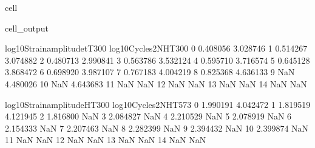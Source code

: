 \documentclass[letterpaper,10pt,english]{jupyterBook}
\begin{document}
\begin{sphinxuseclass}{cell}
\begin{sphinxVerbatimOutput}
\begin{sphinxuseclass}{cell_output}
\begin{sphinxVerbatim}[commandchars=\\\{\}]
					log10Strainamplitude\PYGZus{}tT300  log10Cycles2N\PYGZus{}H\PYGZus{}T300  \PYGZbs{}
					0                    \PYGZhy{}0.408056              3.028746   
					1                    \PYGZhy{}0.514267              3.074882   
					2                    \PYGZhy{}0.480713              2.990841   
					3                    \PYGZhy{}0.563786              3.532124   
					4                    \PYGZhy{}0.595710              3.716574   
					5                    \PYGZhy{}0.645128              3.868472   
					6                    \PYGZhy{}0.698920              3.987107   
					7                    \PYGZhy{}0.767183              4.004219   
					8                    \PYGZhy{}0.825368              4.636133   
					9                          NaN              4.480026   
					10                         NaN              4.643683   
					11                         NaN                   NaN   
					12                         NaN                   NaN   
					13                         NaN                   NaN   
					14                         NaN                   NaN   
					
					log10Strainamplitude\PYGZus{}H\PYGZus{}T300  log10Cycles2N\PYGZus{}H\PYGZus{}T573  \PYGZbs{}
					0                     \PYGZhy{}1.990191              4.042472   
					1                     \PYGZhy{}1.819519              4.121945   
					2                     \PYGZhy{}1.816800                   NaN   
					3                     \PYGZhy{}2.084827                   NaN   
					4                     \PYGZhy{}2.210529                   NaN   
					5                     \PYGZhy{}2.078919                   NaN   
					6                     \PYGZhy{}2.154333                   NaN   
					7                     \PYGZhy{}2.207463                   NaN   
					8                     \PYGZhy{}2.282399                   NaN   
					9                     \PYGZhy{}2.394432                   NaN   
					10                    \PYGZhy{}2.399874                   NaN   
					11                          NaN                   NaN   
					12                          NaN                   NaN   
					13                          NaN                   NaN   
					14                          NaN                   NaN   
					

\end{sphinxVerbatim}
\end{sphinxuseclass}
\end{sphinxVerbatimOutput}
\end{sphinxuseclass}
\end{document}
